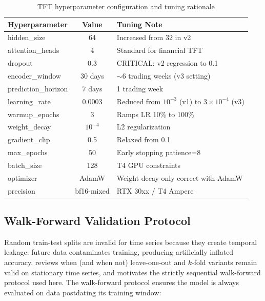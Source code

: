 \documentclass[conference]{IEEEtran}
\begin{document}
\begin{table}[htbp]
\centering
\caption{TFT hyperparameter configuration and tuning rationale}
\label{tab:tft_config}
\scriptsize
\setlength{\tabcolsep}{3pt}
\begin{tabular}{lcl}
\toprule
\textbf{Hyperparameter} & \textbf{Value} & \textbf{Tuning Note} \\
\midrule
hidden\_size & 64 & Increased from 32 in v2 \\
attention\_heads & 4 & Standard for financial TFT \\
dropout & 0.3 & CRITICAL: v2 regression to 0.1 \\
encoder\_window & 30 days & $\sim{}$6 trading weeks (v3 setting) \\
prediction\_horizon & 7 days & 1 trading week \\
learning\_rate & 0.0003 & Reduced from $10^{-3}$ (v1) to $3\times 10^{-4}$ (v3) \\
warmup\_epochs & 3 & Ramps LR 10\% to 100\% \\
weight\_decay & $10^{-4}$ & L2 regularization \\
gradient\_clip & 0.5 & Relaxed from 0.1 \\
max\_epochs & 50 & Early stopping patience=8 \\
batch\_size & 128 & T4 GPU constraints \\
optimizer & AdamW & Weight decay only correct with AdamW \\
precision & bf16-mixed & RTX 30xx / T4 Ampere \\
\bottomrule
\end{tabular}
\normalsize
\end{table}

\subsection{Walk-Forward Validation Protocol}

Random train-test splits are invalid for time series because they create temporal leakage: future data contaminates training, producing artificially inflated accuracy. \cite{ref:bergmeir_cv_ts} reviews when (and when not) leave-one-out and $k$-fold variants remain valid on stationary time series, and motivates the strictly sequential walk-forward protocol used here. The walk-forward protocol ensures the model is always evaluated on data postdating its training window:
\end{document}
